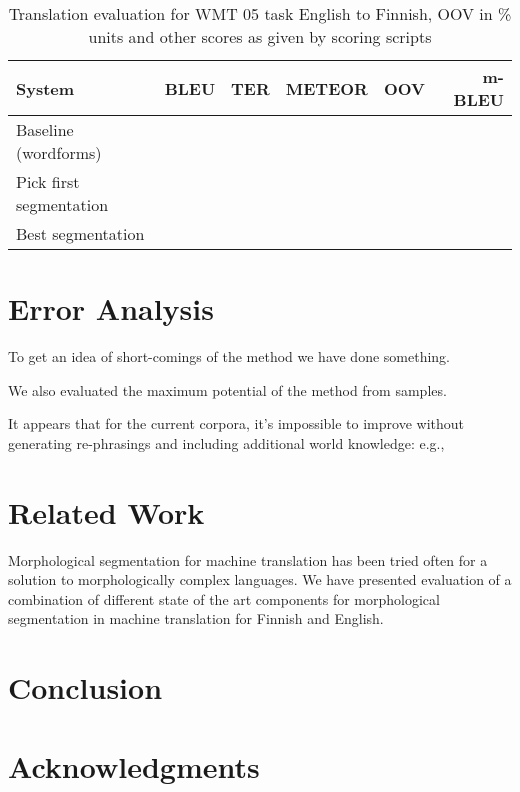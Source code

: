 \documentclass[11pt,letterpaper]{article}
\begin{document}
\begin{table}
    \begin{center}
        \begin{tabular}{|l|rrrrr|}
            \hline
            \bf System & \bf BLEU & \bf TER & \bf METEOR & \bf OOV & m-BLEU \\
            \hline
            Baseline (wordforms) & & & & \\
            Pick first segmentation & & & & \\
            Best segmentation & & & & \\
            \hline
        \end{tabular}
    \end{center}
    \caption{\label{table:translation-evaluation-fin-eng} Translation
        evaluation for WMT 05 task English to Finnish, OOV in \% units
    and other scores as given by scoring scripts}
\end{table}


\section{Error Analysis}
\label{sec:error-analysis}

To get an idea of short-comings of the method we have done something.

We also evaluated the maximum potential of the method from samples.

It appears that for the current corpora, it's impossible to improve without
generating re-phrasings and including additional world knowledge: e.g.,

\section{Related Work}
\label{sec:discussion}

Morphological segmentation for machine translation has been tried often for a
solution to morphologically complex languages. We have presented evaluation
of a combination of different state of the art components for morphological
segmentation in machine translation for Finnish and English.



\section{Conclusion}
\label{sec:conclusion}

\section*{Acknowledgments}




\end{document}
